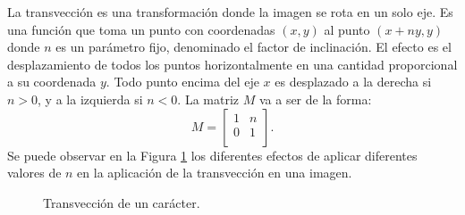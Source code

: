 			La transvección es una transformación donde la imagen se rota en un solo eje. Es una función que toma un punto con coordenadas $(x,y)$ al punto $(x +ny, y)$ donde $n$ es un parámetro fijo, denominado el factor de inclinación. El efecto es el desplazamiento de todos los puntos horizontalmente en una cantidad proporcional a su coordenada $y$. Todo punto encima del eje $x$ es desplazado a la derecha si $n > 0$, y a la izquierda si $n < 0$. La matriz $M$ va a ser de la forma:
			\begin{equation}
				M = 
				\begin{bmatrix}
					1 & n \\
					0 & 1 \\
				\end{bmatrix}.
			\end{equation}
		Se puede observar en la Figura \ref{fig: Transformacion Afin - Transveccion} los diferentes efectos de aplicar diferentes valores de $n$ en la aplicación de la transvección en una imagen.
		\begin{figure}[htbp]
			\centering
			\caption[Transvección de un carácter]{Transvección de un carácter.}
			\label{fig: Transformacion Afin - Transveccion}
		\end{figure}	
		

